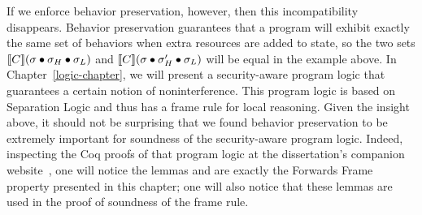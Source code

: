 If we enforce behavior preservation, however, then this
incompatibility disappears. Behavior preservation guarantees
that a program will exhibit exactly the same set of behaviors
when extra resources are added to state, so the two sets 
$\llbracket C \rrbracket(\sigma \bullet \sigma_H \bullet \sigma_L)$
and $\llbracket C \rrbracket(\sigma \bullet \sigma_H' \bullet \sigma_L)$ will
be equal in the example above. In Chapter~\ref{logic-chapter}, we will
present a security-aware program logic that guarantees a certain notion
of noninterference. This program logic is based on Separation
Logic and thus has a frame rule for local reasoning. Given
the insight above, it should not be surprising that we found behavior
preservation to be extremely important for soundness of the
security-aware program logic. Indeed, inspecting the Coq
proofs of that program logic at the dissertation's companion
website~\cite{costanzo-thesis}, one will notice the lemmas
 and  are exactly the Forwards
Frame property presented in this chapter; one will also notice
that these lemmas are used in the proof of soundness of the 
frame rule.












